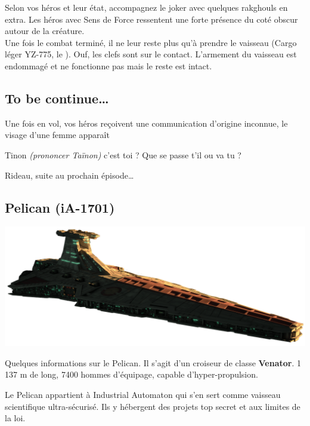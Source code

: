 Selon vos héros et leur état, accompagnez le joker avec quelques rakghouls en extra. Les héros avec Sens de Force ressentent une forte présence du coté obscur autour de la créature.\\

Une fois le combat terminé, il ne leur reste plus qu’à prendre le vaisseau (Cargo léger YZ-775, le ). Ouf, les clefs sont sur le contact. L’armement du vaisseau est endommagé et ne fonctionne pas mais le reste est intact.

\subsection{To be continue\ldots}
Une fois en vol, vos héros reçoivent une communication d’origine inconnue, le visage d’une femme apparaît

\begin{quotebox}
	Tinon \emph{(prononcer Taïnon)} c’est toi ? Que se passe t’il ou va tu ?
\end{quotebox}

Rideau, suite au prochain épisode\ldots


\clearpage
\subsection{Pelican (iA-1701)} \label{sec:pelican}
\includegraphics[width=\textwidth]{_img/dos-au-muur/venator.png}
\vspace{-4\baselineskip}

Quelques informations sur le Pelican. Il s’agit d’un croiseur de classe \textbf{Venator}. 1 137 m de long, 7400 hommes d’équipage, capable d’hyper-propulsion.

Le Pelican appartient à Industrial Automaton qui s’en sert comme vaisseau scientifique ultra-sécurisé. Ils y hébergent des projets top secret et aux limites de la loi.

